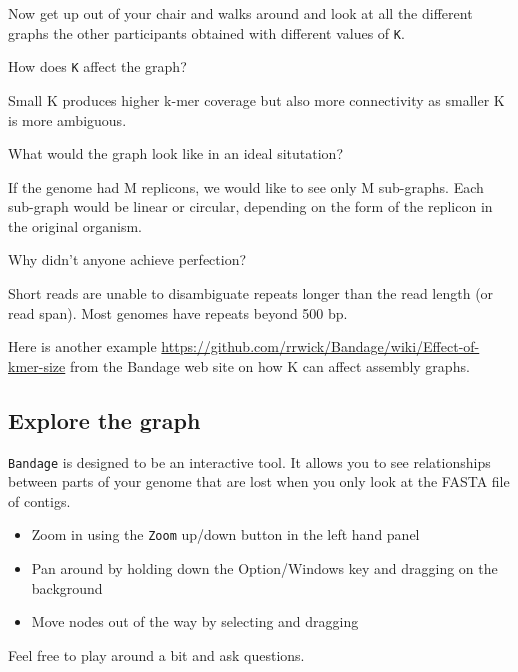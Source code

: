 Now get up out of your chair and walks around and look at all the different graphs the other participants obtained with different values of \texttt{K}.
\begin{questions}
How does \texttt{K} affect the graph? \\
\begin{answer}
Small K produces higher k-mer coverage but also more connectivity as smaller K
is more ambiguous.
\end{answer}
What would the graph look like in an ideal situtation? \\
\begin{answer}
If the genome had M replicons, we would like to see only M sub-graphs.
Each sub-graph would be linear or circular, depending on the form of
the replicon in the original organism.
\end{answer}
Why didn't anyone achieve perfection? \\
\begin{answer}
Short reads are unable to disambiguate repeats longer than the read length
(or read span). Most genomes have repeats beyond 500 bp.
\end{answer}
\end{questions}

Here is another example \url{https://github.com/rrwick/Bandage/wiki/Effect-of-kmer-size}
from the Bandage web site on how K can affect assembly graphs.

\subsection{Explore the graph}

\texttt{Bandage} is designed to be an interactive tool. It allows you to see
relationships between parts of your genome that are lost when you
 only look at the FASTA file of contigs.
\begin{itemize}
\item Zoom in using the \texttt{Zoom} up/down button in the left hand panel
\item Pan around by holding down the Option/Windows key and dragging on the background
\item Move nodes out of the way by selecting and dragging
\end{itemize}
Feel free to play around a bit and ask questions.

